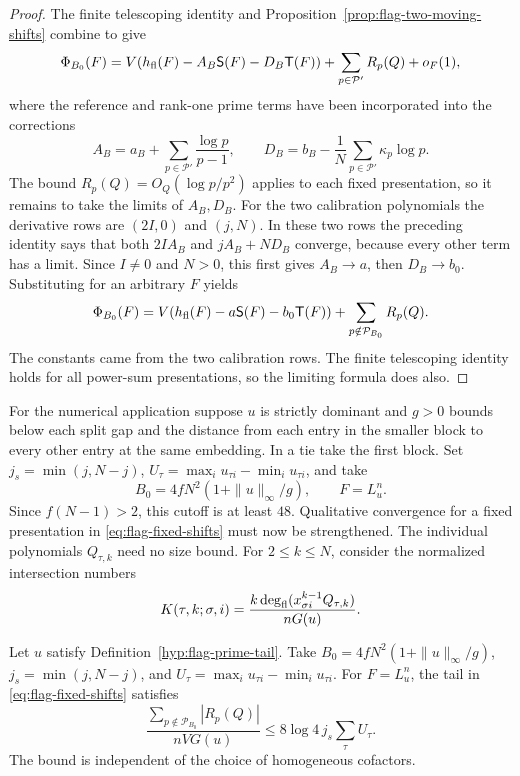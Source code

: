 \begin{proof}
The finite telescoping identity and
Proposition~\ref{prop:flag-two-moving-shifts} combine to give
\[
 \Phi_{B_0}(F)=V(h_{\rm fl}(F)-A_B\mathsf S(F)-D_B\mathsf T(F))
                    +\sum_{p\in\mathcal P'}R_p(Q)+o_F(1),
\]
where the reference and rank-one prime terms have been incorporated
into the corrections
\[
 A_B=a_B+\sum_{p\in\mathcal P'}\frac{\log p}{p-1},
 \qquad D_B=b_B-\frac1N\sum_{p\in\mathcal P'}\kappa_p\log p .
\]
The bound \(R_p(Q)=O_Q(\log p/p^2)\) applies to each fixed
presentation, so it remains to take the limits of \(A_B,D_B\).
For the two calibration polynomials the derivative rows are
\((2I,0)\) and \((j,N)\). In these two rows the preceding
identity says that both \(2I A_B\) and \(jA_B+ND_B\)
converge, because every other term has a limit. Since
\(I\ne0\) and \(N>0\), this first gives \(A_B\to a\), then
\(D_B\to b_0\). Substituting for an arbitrary \(F\) yields
\begin{equation}\label{eq:flag-fixed-shifts}
 \Phi_{B_0}(F)=V(h_{\rm fl}(F)-a\mathsf S(F)-b_0\mathsf T(F))
                        +\sum_{p\notin\mathcal P_{B_0}}R_p(Q).
\end{equation}
The constants came from the two calibration rows. The finite
telescoping identity holds for all power-sum presentations, so
the limiting formula does also.

\end{proof}

\begin{paramdefinition}\label{hyp:flag-prime-tail}
For the numerical application suppose \(u\) is strictly
dominant and \(g>0\) bounds below each split gap and the
distance from each entry in the smaller block to every other
entry at the same embedding. In a tie take the first block.
Set \(j_s=\min(j,N-j)\), \(U_\tau=\max_i u_{\tau i}-\min_i
u_{\tau i}\), and take
\[
 B_0=4fN^2(1+\|u\|_\infty/g),\qquad F=L_u^n .
\]
Since \(f(N-1)>2\), this cutoff is at least \(48\).
Qualitative convergence for a fixed presentation in
\eqref{eq:flag-fixed-shifts} must now be strengthened. The
individual polynomials \(Q_{\tau,k}\) need no size bound.
For \(2\le k\le N\), consider the normalized intersection numbers
\[
 K(\tau,k;\sigma,i)=
  \frac{k\deg_{\rm fl}(x_{\sigma i}^{k-1}Q_{\tau,k})}{nG(u)} .
\]
\end{paramdefinition}

\begin{proposition}\label{prop:flag-uniform-prime-tail}
Let \(u\) satisfy Definition~\ref{hyp:flag-prime-tail}. Take
\(B_0=4fN^2(1+\|u\|_\infty/g)\), \(j_s=\min(j,N-j)\),
and \(U_\tau=\max_i u_{\tau i}-\min_i u_{\tau i}\).
For \(F=L_u^n\), the tail in \eqref{eq:flag-fixed-shifts}
satisfies
\[
 \frac{\sum_{p\notin\mathcal P_{B_0}}|R_p(Q)|}{nVG(u)}
                         \le 8\log4\, j_s\sum_\tau U_\tau .
\]
The bound is independent of the choice of homogeneous cofactors.
\end{proposition}


